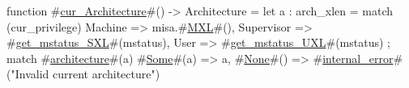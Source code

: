 function #\hyperref[sailRISCVzcurzyArchitecture]{cur\_Architecture}#() -> Architecture = {
  let a : arch_xlen =
    match (cur_privilege) {
      Machine    => misa.#\hyperref[sailRISCVzMXL]{MXL}#(),
      Supervisor => #\hyperref[sailRISCVzgetzymstatuszySXL]{get\_mstatus\_SXL}#(mstatus),
      User       => #\hyperref[sailRISCVzgetzymstatuszyUXL]{get\_mstatus\_UXL}#(mstatus)
    };
  match #\hyperref[sailRISCVzarchitecture]{architecture}#(a) {
    #\hyperref[sailRISCVzSome]{Some}#(a) => a,
    #\hyperref[sailRISCVzNone]{None}#()  => #\hyperref[sailRISCVzinternalzyerror]{internal\_error}#("Invalid current architecture")
  }
}

